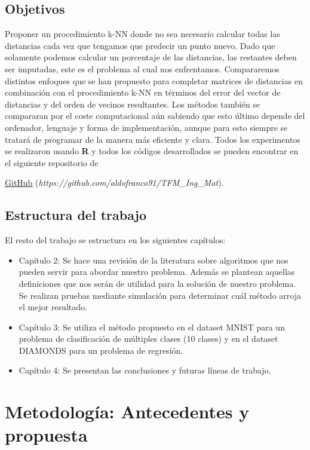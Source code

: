 \documentclass[12pt]{report} %
\theoremstyle{definition}
\begin{document}
\section{Objetivos}
Proponer un procedimiento k-NN donde no sea necesario calcular todas las distancias cada vez que tengamos que predecir un punto nuevo. Dado que solamente podemos calcular un porcentaje de las distancias, las restantes deben ser imputadas, este es el problema al cual nos enfrentamos. Compararemos distintos enfoques que se han propuesto para completar matrices de distancias \cite{MetricNearnessProblemApplications} \cite{DeSoete1984}  \cite{Lapointe} en combinación con el procedimiento k-NN en términos del error del vector de distancias y del orden de vecinos resultantes. Los métodos también se compararan por el coste computacional aún sabiendo que esto último depende del ordenador, lenguaje y forma de implementación, aunque para esto siempre se tratará de programar de la manera más eficiente y clara. Todos los experimentos se realizaron usando \textbf{\textsf{R}} \cite{R} y todos los códigos desarrollados se pueden encontrar en el siguiente repositorio de  {\href{https://github.com/aldofranco91/TFM_Ing_Mat}{\underline{GitHub}} (\emph{https://github.com/aldofranco91/TFM\_Ing\_Mat}).

\section{Estructura del trabajo}
El resto del trabajo se estructura en los siguientes capítulos:

\begin{itemize}
	\item Capítulo 2: Se hace una revisión de la literatura sobre algoritmos que nos pueden servir para abordar nuestro problema. Además se plantean aquellas definiciones que nos serán de utilidad para la solución de nuestro problema. Se realizan pruebas mediante simulación para determinar cuál método arroja el mejor resultado.
	\item Capítulo 3: Se utiliza el método propuesto en el dataset MNIST \cite{mnist} para un problema de  clasificación de múltiples clases (10 clases) y en el dataset DIAMONDS para un problema de regresión.
	\item Capítulo 4: Se presentan las conclusiones y futuras líneas de trabajo.
\end{itemize}

\chapter{Metodología: Antecedentes y propuesta}

}
\end{document}
